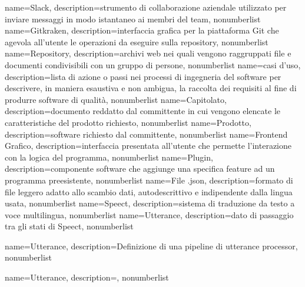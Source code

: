 {
	name={Slack},
	description={strumento di collaborazione aziendale utilizzato per inviare messaggi in modo istantaneo ai membri del team},
	nonumberlist
}
{
	name={Gitkraken},
	description={interfaccia grafica per la piattaforma Git che agevola all'utente le operazioni da eseguire sulla repository},
	nonumberlist
}
{
	name={Repository},
	description={archivi web nei quali vengono raggruppati file e documenti condivisibili con un gruppo di persone},
	nonumberlist
}
{
	name={casi d'uso},
	description={lista di azione o passi nei processi di ingegneria del software per descrivere, in maniera esaustiva e non ambigua, la raccolta dei requisiti al fine di produrre software di qualità},
	nonumberlist
}
{
	name={Capitolato},
	description={documento reddatto dal committente in cui vengono elencate le caratteristiche del prodotto richiesto},
	nonumberlist
}
{
	name={Prodotto},
	description={software richiesto dal committente},
	nonumberlist
}
{
	name={Frontend Grafico},
	description={interfaccia presentata all'utente che permette l'interazione con la logica del programma},
	nonumberlist
}
{
	name={Plugin},
	description={componente software che aggiunge una specifica feature ad un programma preesistente},
	nonumberlist
}
{
	name={File .json},
	description={formato di file leggero adatto allo scambio dati, autodescrittivo e indipendente dalla lingua usata},
	nonumberlist
}
{
	name={Speect},
	description={sistema di traduzione da testo a voce multilingua},
	nonumberlist
}
{
	name={Utterance},
	description={dato di passaggio tra gli stati di Speect},
	nonumberlist
}

{
name={Utterance},
description={Definizione di una pipeline di utterance processor},
nonumberlist
}

{
	name={Utterance},
	description={},
	nonumberlist
}

